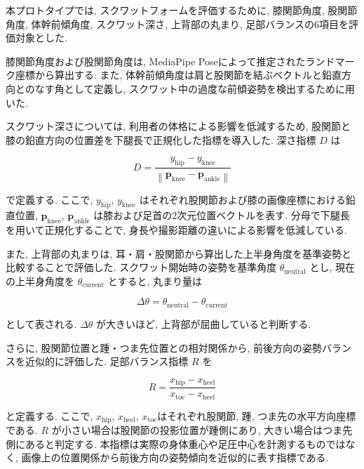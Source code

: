 \documentclass[a4paper,9pt,twocolumn]{jsarticle}
\begin{document}
本プロトタイプでは, スクワットフォームを評価するために, 膝関節角度, 股関節角度, 体幹前傾角度, スクワット深さ, 上背部の丸まり, 足部バランスの6項目を評価対象とした. 

膝関節角度および股関節角度は, MediaPipe Poseによって推定されたランドマーク座標から算出する. 
また, 体幹前傾角度は肩と股関節を結ぶベクトルと鉛直方向とのなす角として定義し, スクワット中の過度な前傾姿勢を検出するために用いた. 

スクワット深さについては, 利用者の体格による影響を低減するため, 
股関節と膝の鉛直方向の位置差を下腿長で正規化した指標を導入した. 
深さ指標 $D$ は

\begin{equation}
D=
\frac{
y_{\mathrm{hip}}-y_{\mathrm{knee}}
}{
\left\|
\mathbf{p}_{\mathrm{knee}}
-
\mathbf{p}_{\mathrm{ankle}}
\right\|
}
\end{equation}

で定義する. 
ここで, 
$y_{\mathrm{hip}}$, 
$y_{\mathrm{knee}}$
はそれぞれ股関節および膝の画像座標における鉛直位置, 
$\mathbf{p}_{\mathrm{knee}}$, 
$\mathbf{p}_{\mathrm{ankle}}$
は膝および足首の2次元位置ベクトルを表す. 
分母で下腿長を用いて正規化することで, 身長や撮影距離の違いによる影響を低減している. 

また, 上背部の丸まりは, 耳・肩・股関節から算出した上半身角度を基準姿勢と比較することで評価した. 
スクワット開始時の姿勢を基準角度 $\theta_{\mathrm{neutral}}$ とし, 現在の上半身角度を $\theta_{\mathrm{current}}$ とすると, 丸まり量は

\begin{equation}
\Delta\theta
=
\theta_{\mathrm{neutral}}
-
\theta_{\mathrm{current}}
\end{equation}

として表される. 
$\Delta\theta$ が大きいほど, 上背部が屈曲していると判断する. 

さらに, 股関節位置と踵・つま先位置との相対関係から, 前後方向の姿勢バランスを近似的に評価した. 
足部バランス指標 $R$ を

\begin{equation}
R=\frac{x_{\mathrm{hip}}-x_{\mathrm{heel}}}{x_{\mathrm{toe}}-x_{\mathrm{heel}}}
\end{equation}

と定義する. 
ここで, $x_{\mathrm{hip}}$, $x_{\mathrm{heel}}$, $x_{\mathrm{toe}}$はそれぞれ股関節, 踵, つま先の水平方向座標である. 
$R$ が小さい場合は股関節の投影位置が踵側にあり, 大きい場合はつま先側にあると判定する. 
本指標は実際の身体重心や足圧中心を計測するものではなく, 画像上の位置関係から前後方向の姿勢傾向を近似的に表す指標である. 
\end{document}

